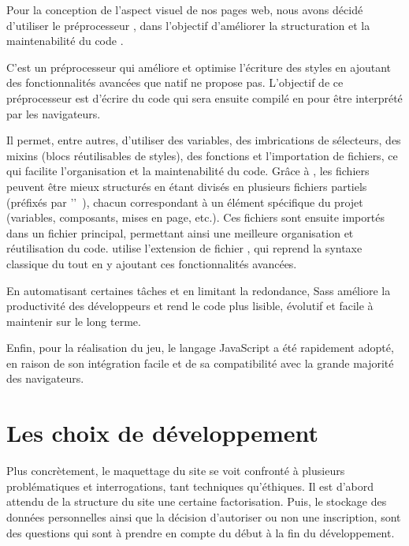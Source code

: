 Pour la conception de l'aspect visuel de nos pages web, nous avons décidé d'utiliser le préprocesseur , dans l'objectif d’améliorer la structuration et la maintenabilité du code .

C'est un préprocesseur  qui améliore et optimise l'écriture des styles en ajoutant des fonctionnalités avancées que  natif ne propose pas.
L'objectif de ce préprocesseur est d'écrire du code  qui sera ensuite compilé en  pour être interprété par les navigateurs.

Il permet, entre autres, d’utiliser des variables, des imbrications de sélecteurs, des mixins (blocs réutilisables de styles), des fonctions et l’importation de fichiers, ce qui facilite l'organisation et la maintenabilité du code.
Grâce à , les fichiers  peuvent être mieux structurés en étant divisés en plusieurs fichiers partiels (préfixés par '\logo{\_}'~), chacun correspondant à un élément spécifique du projet (variables, composants, mises en page, etc.). 
Ces fichiers sont ensuite importés dans un fichier principal, permettant ainsi une meilleure organisation et réutilisation du code.
 utilise l’extension de fichier , qui reprend la syntaxe classique du  tout en y ajoutant ces fonctionnalités avancées.

En automatisant certaines tâches et en limitant la redondance, Sass améliore la productivité des développeurs et rend le code plus lisible, évolutif et facile à maintenir sur le long terme.
\bigskip

Enfin, pour la réalisation du jeu, le langage JavaScript a été rapidement adopté, en raison de son intégration facile et de sa compatibilité avec la grande majorité des navigateurs.




\section{Les choix de développement}  
\label{sec:difficultes}

Plus concrètement, le maquettage du site se voit confronté à plusieurs problématiques et interrogations, tant techniques qu'éthiques. Il est d'abord attendu de la structure du site une certaine factorisation. Puis, le stockage des données personnelles ainsi que la décision d'autoriser ou non une inscription, sont des questions qui sont à prendre en compte du début à la fin du développement.

